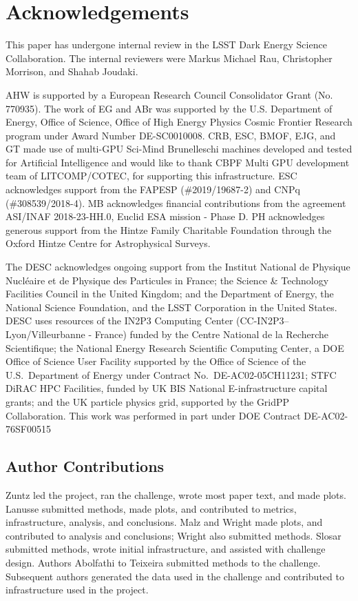 \documentclass[twocolumn,twocolappendix]{aastex63}
\begin{document}
\section{Acknowledgements}

This paper has undergone internal review in the LSST Dark Energy Science Collaboration.
The internal reviewers were Markus Michael Rau, Christopher Morrison, and Shahab Joudaki.

AHW is supported by a European Research Council Consolidator Grant (No. 770935).
The work of EG and ABr was supported by the U.S. Department of Energy, Office of Science, Office of High Energy Physics Cosmic Frontier Research program under Award Number DE-SC0010008.
CRB, ESC, BMOF, EJG, and GT made use of multi-GPU Sci-Mind Brunelleschi machines developed and tested for Artificial Intelligence and would like to thank CBPF Multi GPU development team of LITCOMP/COTEC, for supporting this infrastructure.
ESC acknowledges support from the FAPESP (\#2019/19687-2) and CNPq  (\#308539/2018-4).
MB acknowledges financial contributions from the agreement ASI/INAF 2018-23-HH.0, Euclid ESA mission - Phase D.
PH acknowledges generous support from the Hintze Family Charitable Foundation through the Oxford Hintze Centre for Astrophysical Surveys.


The DESC acknowledges ongoing support from the Institut National de
Physique Nucl\'eaire et de Physique des Particules in France; the
Science \& Technology Facilities Council in the United Kingdom; and the
Department of Energy, the National Science Foundation, and the LSST
Corporation in the United States.  DESC uses resources of the IN2P3
Computing Center (CC-IN2P3--Lyon/Villeurbanne - France) funded by the
Centre National de la Recherche Scientifique; the National Energy
Research Scientific Computing Center, a DOE Office of Science User
Facility supported by the Office of Science of the U.S.\ Department of
Energy under Contract No.\ DE-AC02-05CH11231; STFC DiRAC HPC Facilities,
funded by UK BIS National E-infrastructure capital grants; and the UK
particle physics grid, supported by the GridPP Collaboration.  This
work was performed in part under DOE Contract DE-AC02-76SF00515

\subsection{Author Contributions}
Zuntz led the project, ran the challenge, wrote most paper text, and made plots.
Lanusse submitted methods, made plots, and contributed to metrics, infrastructure, analysis, and conclusions.
Malz and Wright made plots, and contributed to analysis and conclusions; Wright also submitted methods.
Slosar submitted methods, wrote initial infrastructure, and assisted with challenge design.
Authors Abolfathi to Teixeira submitted methods to the challenge.
Subsequent authors generated the data used in the challenge and contributed to infrastructure used in the project.
\end{document}
